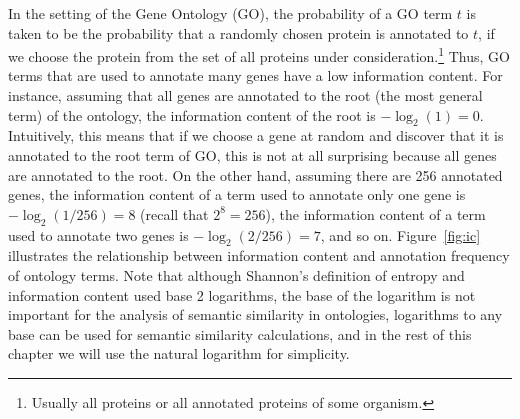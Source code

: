 \documentclass{article}
\begin{document}
 
In the setting of the Gene Ontology (GO), the probability of a GO term 
$t$ is taken to be the probability that a randomly chosen protein is 
annotated to $t$, if we choose the protein from the set of all 
proteins under consideration.\footnote{Usually all proteins or all 
  annotated proteins of some organism.}  Thus, GO terms that are used 
to annotate many genes have a low information content. For instance, 
assuming that all genes are annotated to the root (the most general 
term) of the ontology, the information content of the root is 
$-\log_2(1)=0$. Intuitively, this means that if we choose a gene at 
random and discover that it is annotated to the root term of GO, this 
is not at all surprising because all genes are annotated to the 
root. On the other hand, assuming there are 256 annotated genes, the 
information content of a term used to annotate only one gene is 
$-\log_2(1/256)=8$ (recall that $2^8=256$), the information content of 
a term used to annotate two genes is $-\log_2(2/256)=7$, and so on. 
Figure~\ref{fig:ic} illustrates the relationship between information 
content and annotation frequency of ontology terms. Note that although 
Shannon's definition of entropy and information content used base 2 
logarithms, the base of the logarithm is not important for the 
analysis of semantic similarity in ontologies, logarithms to any 
base can be used for semantic similarity calculations, and in the rest 
of this chapter we will use the natural logarithm for simplicity. 
 
\end{document}
